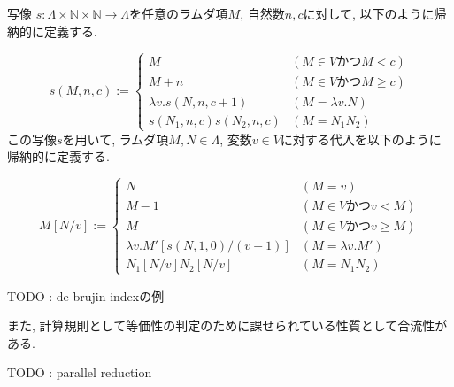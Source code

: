 \documentclass{ltjsarticle}
\begin{document}
\begin{defn}
 写像 $s \colon \Lambda \times \mathbb{N} \times \mathbb{N} \rightarrow \Lambda$を任意のラムダ項$M$, 自然数$n, c$に対して, 以下のように帰納的に定義する.
 
\[
  s (M, n, c) := \begin{cases}
    M & (M \in V \text{かつ} M < c) \\
    M + n & (M \in V \text{かつ} M \geq c) \\
    \lambda v. s (N, n, c + 1) & (M = \lambda v. N) \\
    s (N_1, n, c) s (N_2, n, c) & (M = N_1 N_2)
  \end{cases}
\]
 この写像$s$を用いて, ラムダ項$M, N \in \Lambda$, 変数$v \in V$に対する代入を以下のように帰納的に定義する.
 
\[
 M[N/v] := \begin{cases}
    N & (M = v) \\
    M - 1 & (M \in V \text{かつ} v < M) \\
    M & (M \in V \text{かつ} v \geq M) \\
    \lambda v. M' [s (N, 1, 0)/(v + 1)] & (M = \lambda v. M') \\
    N_1[N/v] N_2[N/v] & (M = N_1 N_2)
  \end{cases}
\]
\end{defn}

\begin{ex}
 TODO : de brujin indexの例
\end{ex}

また, 計算規則として等価性の判定のために課せられている性質として合流性がある.

\begin{defn}
 TODO : parallel reduction
\end{defn}
\end{document}
